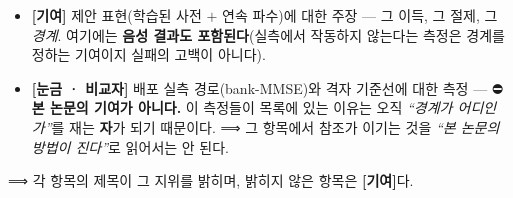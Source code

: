 \documentclass[11pt]{report}
\numberwithin{equation}{chapter}
\numberwithin{figure}{chapter}
\numberwithin{table}{chapter}
\begin{document}
\begin{itemize}
  \item \textbf{[기여]} 제안 표현(학습된 사전 $+$ 연속 파수)에 대한 주장 --- 그 이득,
        그 절제, 그 \emph{경계}. 여기에는 \textbf{음성 결과도 포함된다}(실측에서 작동하지
        않는다는 측정은 경계를 정하는 기여이지 실패의 고백이 아니다).
  \item \textbf{[눈금 · 비교자]} 배포 실측 경로(bank-MMSE)와 격자 기준선에 대한 측정 ---
        ⛔\textbf{본 논문의 기여가 아니다.} 이 측정들이 목록에 있는 이유는 오직
        \emph{``경계가 어디인가''}를 재는 \textbf{자}가 되기 때문이다.
        ⟹ 그 항목에서 참조가 이기는 것을 \emph{``본 논문의 방법이 진다''}로 읽어서는 안 된다.
\end{itemize}
⟹ 각 항목의 제목이 그 지위를 밝히며, 밝히지 않은 항목은 \textbf{[기여]}다.
\end{document}
